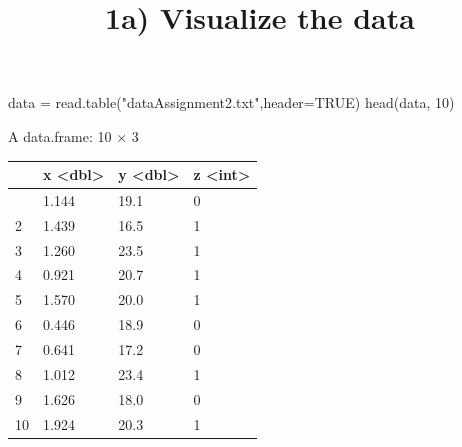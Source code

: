 \documentclass[
  letterpaper,
  DIV=11,
  numbers=noendperiod]{scrartcl}
\title{1a) Visualize the data}
\author{}
\date{}
\newenvironment{Shaded}{\begin{snugshade}}{\end{snugshade}}
\newcommand{\AttributeTok}[1]{\textcolor[rgb]{0.40,0.45,0.13}{#1}}
\newcommand{\ConstantTok}[1]{\textcolor[rgb]{0.56,0.35,0.01}{#1}}
\newcommand{\DecValTok}[1]{\textcolor[rgb]{0.68,0.00,0.00}{#1}}
\newcommand{\FunctionTok}[1]{\textcolor[rgb]{0.28,0.35,0.67}{#1}}
\newcommand{\NormalTok}[1]{\textcolor[rgb]{0.00,0.23,0.31}{#1}}
\newcommand{\OtherTok}[1]{\textcolor[rgb]{0.00,0.23,0.31}{#1}}
\newcommand{\SpecialCharTok}[1]{\textcolor[rgb]{0.37,0.37,0.37}{#1}}
\newcommand{\StringTok}[1]{\textcolor[rgb]{0.13,0.47,0.30}{#1}}
\begin{document}
\maketitle


\begin{Shaded}
\begin{Highlighting}[]
\NormalTok{data }\OtherTok{=} \FunctionTok{read.table}\NormalTok{(}\StringTok{"dataAssignment2.txt"}\NormalTok{,}\AttributeTok{header=}\ConstantTok{TRUE}\NormalTok{)}
\FunctionTok{head}\NormalTok{(data, }\DecValTok{10}\NormalTok{)}
\end{Highlighting}
\end{Shaded}

A data.frame: 10 × 3

\begin{longtable}[]{@{}llll@{}}
\toprule\noalign{}
& x \textless dbl\textgreater{} & y \textless dbl\textgreater{} & z
\textless int\textgreater{} \\
\midrule\noalign{}
\endhead
\bottomrule\noalign{}
\endlastfoot
1 & 1.144 & 19.1 & 0 \\
2 & 1.439 & 16.5 & 1 \\
3 & 1.260 & 23.5 & 1 \\
4 & 0.921 & 20.7 & 1 \\
5 & 1.570 & 20.0 & 1 \\
6 & 0.446 & 18.9 & 0 \\
7 & 0.641 & 17.2 & 0 \\
8 & 1.012 & 23.4 & 1 \\
9 & 1.626 & 18.0 & 0 \\
10 & 1.924 & 20.3 & 1 \\
\end{longtable}

\begin{Shaded}
\end{Shaded}
\end{document}
